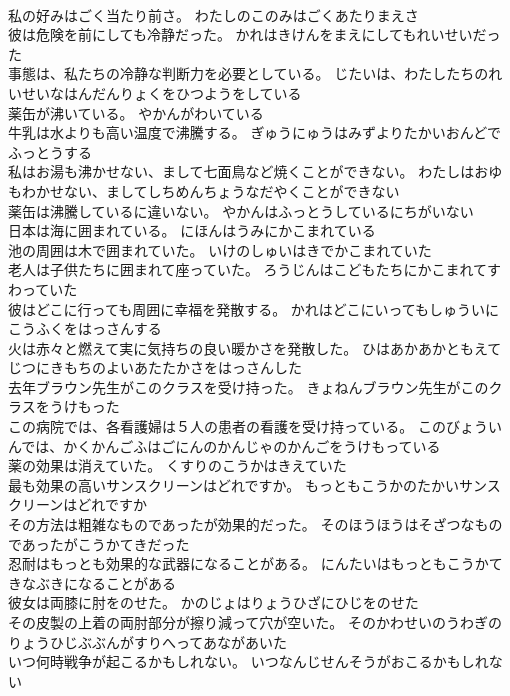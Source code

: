 \documentclass[8pt]{extreport}
\begin{document}
\begin{CJK}{UTF8}{min}
\\	私の好みはごく当たり前さ。	わたしのこのみはごくあたりまえさ 
\\	彼は危険を前にしても冷静だった。	かれはきけんをまえにしてもれいせいだった 
\\	事態は、私たちの冷静な判断力を必要としている。	じたいは、わたしたちのれいせいなはんだんりょくをひつようをしている 
\\	薬缶が沸いている。	やかんがわいている 
\\	牛乳は水よりも高い温度で沸騰する。	ぎゅうにゅうはみずよりたかいおんどでふっとうする 
\\	私はお湯も沸かせない、まして七面鳥など焼くことができない。	わたしはおゆもわかせない、ましてしちめんちょうなだやくことができない 
\\	薬缶は沸騰しているに違いない。	やかんはふっとうしているにちがいない 
\\	日本は海に囲まれている。	にほんはうみにかこまれている 
\\	池の周囲は木で囲まれていた。	いけのしゅいはきでかこまれていた 
\\	老人は子供たちに囲まれて座っていた。	ろうじんはこどもたちにかこまれてすわっていた 
\\	彼はどこに行っても周囲に幸福を発散する。	かれはどこにいってもしゅういにこうふくをはっさんする 
\\	火は赤々と燃えて実に気持ちの良い暖かさを発散した。	ひはあかあかともえてじつにきもちのよいあたたかさをはっさんした 
\\	去年ブラウン先生がこのクラスを受け持った。	きょねんブラウン先生がこのクラスをうけもった 
\\	この病院では、各看護婦は５人の患者の看護を受け持っている。	このびょういんでは、かくかんごふはごにんのかんじゃのかんごをうけもっている 
\\	薬の効果は消えていた。	くすりのこうかはきえていた 
\\	最も効果の高いサンスクリーンはどれですか。	もっともこうかのたかいサンスクリーンはどれですか 
\\	その方法は粗雑なものであったが効果的だった。	そのほうほうはそざつなものであったがこうかてきだった 
\\	忍耐はもっとも効果的な武器になることがある。	にんたいはもっともこうかてきなぶきになることがある 
\\	彼女は両膝に肘をのせた。	かのじょはりょうひざにひじをのせた 
\\	その皮製の上着の両肘部分が擦り減って穴が空いた。	そのかわせいのうわぎのりょうひじぶぶんがすりへってあながあいた 
\\	いつ何時戦争が起こるかもしれない。	いつなんじせんそうがおこるかもしれない 

\end{CJK}
\end{document}
